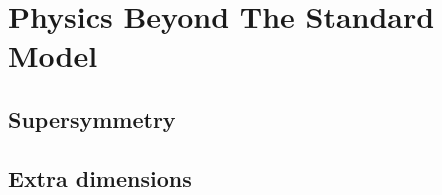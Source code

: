 \section{Physics Beyond The Standard Model}
\label{s:BSM}

\subsection{Supersymmetry}
\label{ss:SUSY}

\subsection{Extra dimensions}
\label{ss:extra_dimensions}



